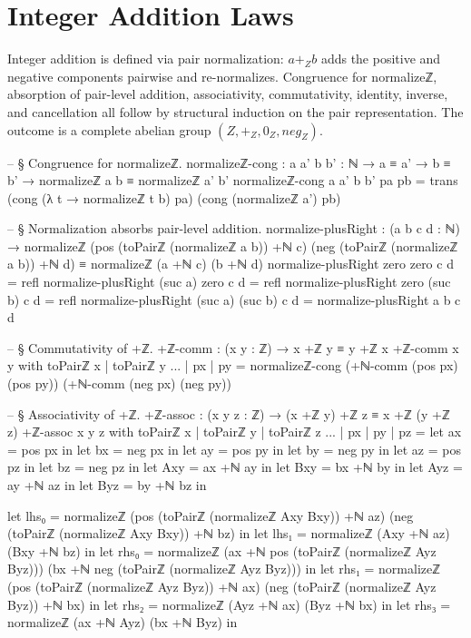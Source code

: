\documentclass[11pt,a4paper]{book}
\def\mathrm#1{#1}%
\def\mathbb#1{#1}%
\def\texttt#1{#1}%
\begin{document}
\section{Integer Addition Laws}

Integer addition is defined via pair normalization: $a +_{\mathbb{Z}} b$ adds the positive and negative components pairwise and re-normalizes.
Congruence for \texttt{normalizeℤ}, absorption of pair-level addition,
associativity, commutativity, identity, inverse, and cancellation all follow by structural induction on the pair representation.
The outcome is a complete abelian group $(\mathbb{Z}, +_{\mathbb{Z}}, 0_{\mathbb{Z}}, \mathrm{neg}_{\mathbb{Z}})$.

\begin{code}
-- § Congruence for normalizeℤ.
normalizeℤ-cong : {a a' b b' : ℕ} → a ≡ a' → b ≡ b' → normalizeℤ a b ≡ normalizeℤ a' b'
normalizeℤ-cong {a} {a'} {b} {b'} pa pb = trans (cong (λ t → normalizeℤ t b) pa) (cong (normalizeℤ a') pb)

-- § Normalization absorbs pair-level addition.
normalize-plusRight : (a b c d : ℕ) →
  normalizeℤ (pos (toPairℤ (normalizeℤ a b)) +ℕ c) (neg (toPairℤ (normalizeℤ a b)) +ℕ d)
    ≡
  normalizeℤ (a +ℕ c) (b +ℕ d)
normalize-plusRight zero zero c d = refl
normalize-plusRight (suc a) zero c d = refl
normalize-plusRight zero (suc b) c d = refl
normalize-plusRight (suc a) (suc b) c d = normalize-plusRight a b c d

-- § Commutativity of +ℤ.
+ℤ-comm : (x y : ℤ) → x +ℤ y ≡ y +ℤ x
+ℤ-comm x y with toPairℤ x | toPairℤ y
... | px | py =
  normalizeℤ-cong (+ℕ-comm (pos px) (pos py)) (+ℕ-comm (neg px) (neg py))

-- § Associativity of +ℤ.
+ℤ-assoc : (x y z : ℤ) → (x +ℤ y) +ℤ z ≡ x +ℤ (y +ℤ z)
+ℤ-assoc x y z with toPairℤ x | toPairℤ y | toPairℤ z
... | px | py | pz =
  let ax = pos px in
  let bx = neg px in
  let ay = pos py in
  let by = neg py in
  let az = pos pz in
  let bz = neg pz in
  let Axy = ax +ℕ ay in
  let Bxy = bx +ℕ by in
  let Ayz = ay +ℕ az in
  let Byz = by +ℕ bz in

  let lhs₀ = normalizeℤ (pos (toPairℤ (normalizeℤ Axy Bxy)) +ℕ az)
                       (neg (toPairℤ (normalizeℤ Axy Bxy)) +ℕ bz) in
  let lhs₁ = normalizeℤ (Axy +ℕ az) (Bxy +ℕ bz) in
  let rhs₀ = normalizeℤ (ax +ℕ pos (toPairℤ (normalizeℤ Ayz Byz)))
                       (bx +ℕ neg (toPairℤ (normalizeℤ Ayz Byz))) in
  let rhs₁ = normalizeℤ (pos (toPairℤ (normalizeℤ Ayz Byz)) +ℕ ax)
                       (neg (toPairℤ (normalizeℤ Ayz Byz)) +ℕ bx) in
  let rhs₂ = normalizeℤ (Ayz +ℕ ax) (Byz +ℕ bx) in
  let rhs₃ = normalizeℤ (ax +ℕ Ayz) (bx +ℕ Byz) in


\end{code}
\end{document}

